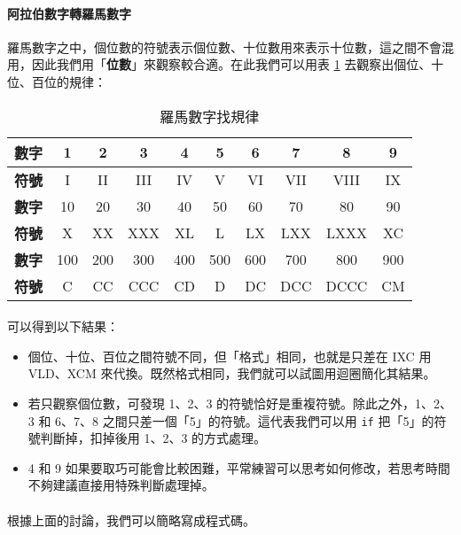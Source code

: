 \documentclass[12pt,a4paper,oneside]{article}
\begin{document}
\begin{CJK}{UTF8}{bkai}
\paragraph{阿拉伯數字轉羅馬數字}羅馬數字之中，個位數的符號表示個位數、十位數用來表示十位數，這之間不會混用，因此我們用「{\color{red}\textbf{位數}}」來觀察較合適。在此我們可以用表 \ref{string:mani:table:roman:number:regular} 去觀察出個位、十位、百位的規律：

\begin{table}[h!]
  \centering
  \begin{tabular}{|c||c|c|c|c|c|c|c|c|c|}
  \hline
  \textbf{數字} & 1 & 2 & 3 & 4 & 5 & 6 & 7 & 8 & 9\\
  \hline
  \textbf{符號} & I & II & III & IV & V & VI & VII & VIII & IX\\
  \hline
  \hline
  \textbf{數字} & 10 & 20 & 30 & 40 & 50 & 60 & 70 & 80 & 90\\
  \hline
  \textbf{符號} & X & XX & XXX & XL & L & LX & LXX & LXXX & XC\\
  \hline
  \hline
  \textbf{數字} & 100 & 200 & 300 & 400 & 500 & 600 & 700 & 800 & 900\\
  \hline
  \textbf{符號} & C & CC & CCC & CD & D & DC & DCC & DCCC & CM\\
  \hline
  \end{tabular}
  \caption{羅馬數字找規律}
  \label{string:mani:table:roman:number:regular}
\end{table}

\paragraph{}可以得到以下結果：
\begin{itemize}
\item 個位、十位、百位之間符號不同，但「格式」相同，也就是只差在 IXC 用 VLD、XCM 來代換。既然格式相同，我們就可以試圖用迴圈簡化其結果。
\item 若只觀察個位數，可發現 1、2、3 的符號恰好是重複符號。除此之外，1、2、3 和 6、7、8 之間只差一個「5」的符號。這代表我們可以用 \lstinline!if! 把「5」的符號判斷掉，扣掉後用 1、2、3 的方式處理。
\item 4 和 9 如果要取巧可能會比較困難，平常練習可以思考如何修改，若思考時間不夠建議直接用特殊判斷處理掉。
\end{itemize}

\paragraph{}根據上面的討論，我們可以簡略寫成程式碼。


\end{CJK}
\end{document}
